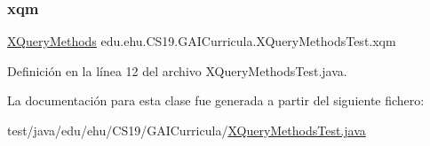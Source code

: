 \subsubsection{\texorpdfstring{xqm}{xqm}}
{\footnotesize\ttfamily \mbox{\hyperlink{classedu_1_1ehu_1_1_c_s19_1_1_g_a_i_curricula_1_1_x_query_methods}{X\+Query\+Methods}} edu.\+ehu.\+C\+S19.\+G\+A\+I\+Curricula.\+X\+Query\+Methods\+Test.\+xqm\hspace{0.3cm}{\ttfamily [package]}}



Definición en la línea 12 del archivo X\+Query\+Methods\+Test.\+java.



La documentación para esta clase fue generada a partir del siguiente fichero\+:\begin{DoxyCompactItemize}
\item 
test/java/edu/ehu/\+C\+S19/\+G\+A\+I\+Curricula/\mbox{\hyperlink{_x_query_methods_test_8java}{X\+Query\+Methods\+Test.\+java}}\end{DoxyCompactItemize}
